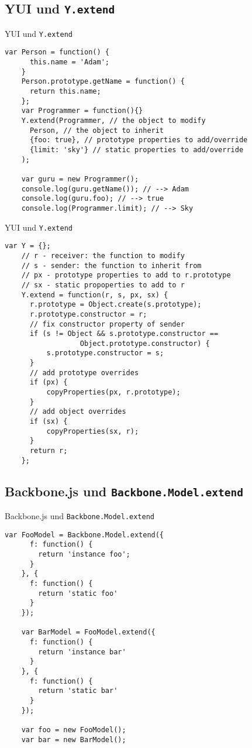 \subsection{YUI und \texttt{Y.extend}}

\begin{frame}[fragile]{YUI und \texttt{Y.extend}}
  \begin{lstlisting}[gobble=4]
    var Person = function() {
      this.name = 'Adam';
    }
    Person.prototype.getName = function() {
      return this.name;
    };
    var Programmer = function(){}
    Y.extend(Programmer, // the object to modify
      Person, // the object to inherit
      {foo: true}, // prototype properties to add/override
      {limit: 'sky'} // static properties to add/override
    );
    
    var guru = new Programmer();
    console.log(guru.getName()); // --> Adam
    console.log(guru.foo); // --> true
    console.log(Programmer.limit); // --> Sky
  \end{lstlisting}
\end{frame}

\begin{frame}[fragile]{YUI und \texttt{Y.extend}}
  \begin{lstlisting}[gobble=4]
    var Y = {};    
    // r - receiver: the function to modify
    // s - sender: the function to inherit from
    // px - prototype properties to add to r.prototype
    // sx - static propoperties to add to r
    Y.extend = function(r, s, px, sx) {
      r.prototype = Object.create(s.prototype);
      r.prototype.constructor = r;
      // fix constructor property of sender
      if (s != Object && s.prototype.constructor ==
                  Object.prototype.constructor) {
          s.prototype.constructor = s;
      }
      // add prototype overrides
      if (px) {
          copyProperties(px, r.prototype);
      }
      // add object overrides
      if (sx) {
          copyProperties(sx, r);
      }
      return r;
    };
  \end{lstlisting}
\end{frame}

\subsection{Backbone.js und \texttt{Backbone.Model.extend}}

\begin{frame}[fragile]{Backbone.js und \texttt{Backbone.Model.extend}}
  \begin{lstlisting}[gobble=4]
    var FooModel = Backbone.Model.extend({
      f: function() {
        return 'instance foo';
      }
    }, {
      f: function() {
        return 'static foo'
      }
    });
    
    var BarModel = FooModel.extend({
      f: function() {
        return 'instance bar'
      }
    }, {
      f: function() {
        return 'static bar'
      }
    });
    
    var foo = new FooModel();
    var bar = new BarModel();
  \end{lstlisting}
\end{frame}

